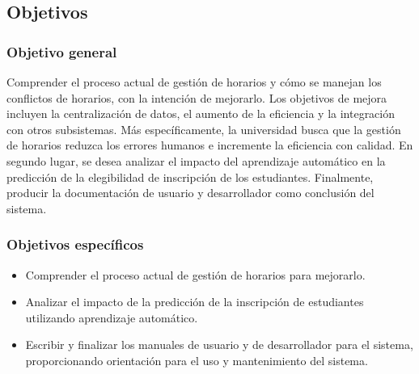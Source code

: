 \subsection{Objetivos}

\subsubsection{Objetivo general}

Comprender el proceso actual de gestión de horarios y cómo se manejan los conflictos de horarios, con la intención de mejorarlo.
Los objetivos de mejora incluyen la centralización de datos, el aumento de la eficiencia y la integración con otros subsistemas.
Más específicamente, la universidad busca que la gestión de horarios reduzca los errores humanos e incremente la eficiencia con calidad.
En segundo lugar, se desea analizar el impacto del aprendizaje automático en la predicción de la elegibilidad de inscripción de los estudiantes.
Finalmente, producir la documentación de usuario y desarrollador como conclusión del sistema.

\subsubsection{Objetivos específicos}

\begin{itemize}
    \item Comprender el proceso actual de gestión de horarios para mejorarlo.
    \item Analizar el impacto de la predicción de la inscripción de estudiantes utilizando aprendizaje automático.
	\item Escribir y finalizar los manuales de usuario y de desarrollador para el sistema, proporcionando orientación para el uso y mantenimiento del sistema.
\end{itemize}

